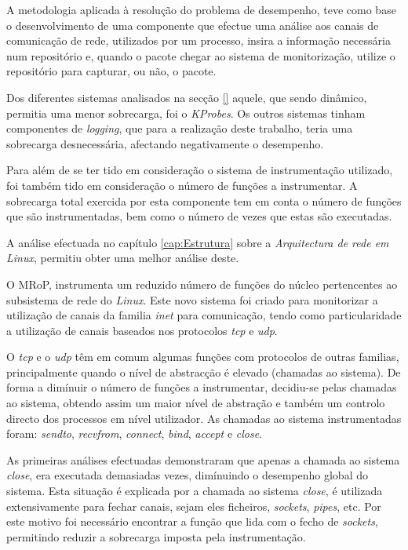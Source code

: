 
A metodologia aplicada à resolução do problema de desempenho, teve como base o desenvolvimento de uma componente que efectue uma análise aos canais de comunicação de rede, utilizados por um processo, insira a informação necessária num repositório e, quando o pacote chegar ao sistema de monitorização, utilize o repositório para capturar, ou não, o pacote.

Dos diferentes sistemas analisados na secção \ref{} aquele, que sendo dinâmico, permitia uma menor sobrecarga, foi o \textit{KProbes}.
Os outros sistemas tinham componentes de \textit{logging}, que para a realização deste trabalho, teria uma sobrecarga desnecessária, afectando negativamente o desempenho.

Para além de se ter tido em consideração o sistema de instrumentação utilizado, foi também tido em consideração o número de funções a instrumentar.
A sobrecarga total exercida por esta componente tem em conta o número de funções que são instrumentadas, bem como o número de vezes que estas são executadas.

A análise efectuada no capítulo \ref{cap:Estrutura} sobre a \textit{Arquitectura de rede em Linux}, permitiu obter uma melhor análise deste.

O MRoP, instrumenta um reduzido número de funções do núcleo pertencentes ao subsistema de rede do \textit{Linux}.
Este novo sistema foi criado para monitorizar a utilização de canais da familia \textit{inet} para comunicação, tendo como particularidade a utilização de canais baseados nos protocolos \textit{tcp} e \textit{udp}.

O \textit{tcp} e o \textit{udp} têm em comum algumas funções com protocolos de outras familias, principalmente quando o nível de abstracção é elevado (chamadas ao sistema).
De forma a dimínuir o número de funções a instrumentar, decidiu-se pelas chamadas ao sistema, obtendo assim um maior nível de abstração e também um controlo directo dos processos em nível utilizador.
As chamadas ao sistema instrumentadas foram: \textit{sendto}, \textit{recvfrom}, \textit{connect}, \textit{bind}, \textit{accept} e \textit{close}.

As primeiras análises efectuadas demonstraram que apenas a chamada ao sistema \textit{close}, era executada demasiadas vezes, dimínuindo o desempenho global do sistema.
Esta situação é explicada por a chamada ao sistema \textit{close}, é utilizada extensivamente para fechar canais, sejam eles ficheiros, \textit{sockets}, \textit{pipes}, etc.
Por este motivo foi necessário encontrar a função que lida com o fecho de \textit{sockets}, permitindo reduzir a sobrecarga imposta pela instrumentação.


